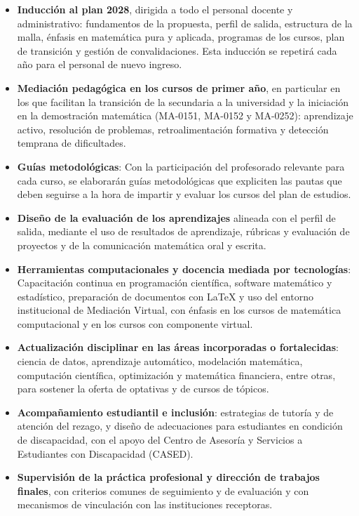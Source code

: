 \begin{itemize}
    \item \textbf{Inducción al plan 2028}, dirigida a todo el personal docente y administrativo: fundamentos de la propuesta, perfil de salida, estructura de la malla, énfasis en matemática pura y aplicada, programas de los cursos, plan de transición y gestión de convalidaciones. Esta inducción se repetirá cada año para el personal de nuevo ingreso.
    \item \textbf{Mediación pedagógica en los cursos de primer año}, en particular en los que facilitan la transición de la secundaria a la universidad y la iniciación en la demostración matemática (MA-0151, MA-0152 y MA-0252): aprendizaje activo, resolución de problemas, retroalimentación formativa y detección temprana de dificultades.
    \item \textbf{Guías metodológicas}: Con la participación del profesorado relevante para cada curso, se elaborarán guías metodológicas que expliciten las pautas que deben seguirse a la hora de impartir y evaluar los cursos del plan de estudios.
    \item \textbf{Diseño de la evaluación de los aprendizajes} alineada con el perfil de salida, mediante el uso de resultados de aprendizaje, rúbricas y evaluación de proyectos y de la comunicación matemática oral y escrita.
    \item \textbf{Herramientas computacionales y docencia mediada por tecnologías}: Capacitación continua en programación científica, software matemático y estadístico, preparación de documentos con \LaTeX{} y uso del entorno institucional de Mediación Virtual, con énfasis en los cursos de matemática computacional y en los cursos con componente virtual.
    \item \textbf{Actualización disciplinar en las áreas incorporadas o fortalecidas}: ciencia de datos, aprendizaje automático, modelación matemática, computación científica, optimización y matemática financiera, entre otras, para sostener la oferta de optativas y de cursos de tópicos.
    \item \textbf{Acompañamiento estudiantil e inclusión}: estrategias de tutoría y de atención del rezago, y diseño de adecuaciones para estudiantes en condición de discapacidad, con el apoyo del Centro de Asesoría y Servicios a Estudiantes con Discapacidad (CASED).
    \item \textbf{Supervisión de la práctica profesional y dirección de trabajos finales}, con criterios comunes de seguimiento y de evaluación y con mecanismos de vinculación con las instituciones receptoras.
\end{itemize}

